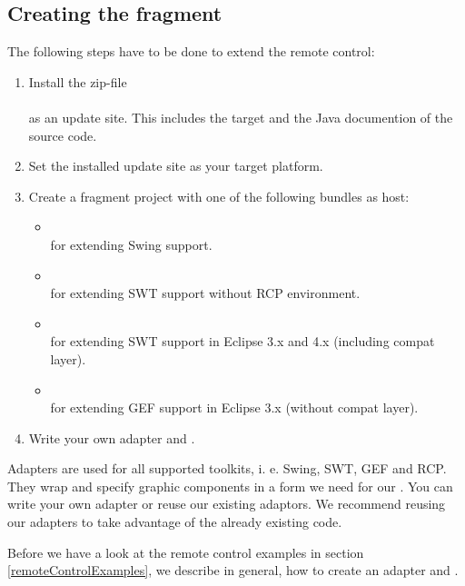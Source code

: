 \subsection{Creating the fragment}

The following steps have to be done to extend the \app{} remote control:

\begin{enumerate}
  \item Install the zip-file\\
        \\
        as an update site. This includes the target and the Java documention of
        the source code.
  \item Set the installed update site as your target platform.
  \item Create a fragment project with one of the following bundles as host:
    \begin{itemize}
      \item {}\\
            for extending Swing support.
      \item {}\\
            for extending SWT support without RCP environment.
      \item {}\\
            for extending SWT support in Eclipse 3.x and 4.x (including compat
            layer).
      \item {}\\
            for extending GEF support in Eclipse 3.x (without compat
            layer).
   \end{itemize}
  \item Write your own adapter and \gdtesterclasses.
\end{enumerate}

Adapters are used for all supported toolkits, i. e. Swing, SWT, GEF and RCP.
They wrap and specify graphic components in a form we need for our
\gdtesterclasses. You can write your own adapter or reuse our existing
adaptors. We recommend reusing our adapters to take advantage of the already
existing code.

Before we have a look at the \app{} remote control examples in section
\ref{remoteControlExamples}, we describe in general, how to create an
adapter and \gdtesterclasses.

